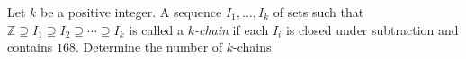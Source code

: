 Let $k$ be a positive integer. A sequence $I_1,\ldots,I_k$ of sets such that $\mathbb{Z}\supseteq I_1\supseteq I_2\supseteq\cdots\supseteq I_k$ is called a \emph{$k$-chain} if each $I_i$ is closed under subtraction and contains $168$. Determine the number of $k$-chains.